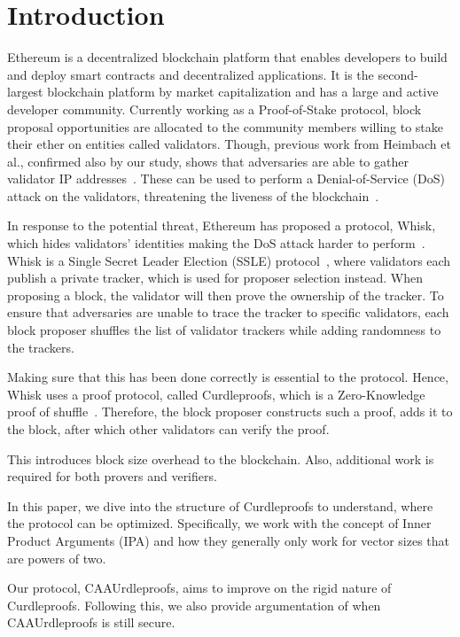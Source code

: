 

\section{Introduction}\label{sec:introduction}
Ethereum is a decentralized blockchain platform that enables developers to build and deploy smart contracts and decentralized applications.
It is the second-largest blockchain platform by market capitalization and has a large and active developer community.
Currently working as a Proof-of-Stake protocol, block proposal opportunities are allocated to the community members willing to stake their ether on entities called validators.
Though, previous work from Heimbach et al., confirmed also by our study, shows that adversaries are able to gather validator IP addresses~\cite{heimbach2024deanonymizingethereumvalidatorsp2p,ouroldpaper}.
These can be used to perform a Denial-of-Service (DoS) attack on the validators, threatening the liveness of the blockchain~\cite{EthereumAttackDefense2024,ouroldpaper}.

In response to the potential threat, Ethereum has proposed a protocol, Whisk, which hides validators' identities making the DoS attack harder to perform~\cite{Whisk2024}.
Whisk is a Single Secret Leader Election (SSLE) protocol~\cite{10.1145/3419614.3423258}, where validators each publish a private tracker, which is used for proposer selection instead.
When proposing a block, the validator will then prove the ownership of the tracker.
To ensure that adversaries are unable to trace the tracker to specific validators, each block proposer shuffles the list of validator trackers while adding randomness to the trackers.

Making sure that this has been done correctly is essential to the protocol.
Hence, Whisk uses a proof protocol, called Curdleproofs, which is a Zero-Knowledge proof of shuffle~\cite{Curdleproofs}.
Therefore, the block proposer constructs such a proof, adds it to the block, after which other validators can verify the proof.

This introduces block size overhead to the blockchain.
Also, additional work is required for both provers and verifiers.

In this paper, we dive into the structure of Curdleproofs to understand, where the protocol can be optimized.
Specifically, we work with the concept of Inner Product Arguments (IPA) and how they generally only work for vector sizes that are powers of two.

Our protocol, CAAUrdleproofs, aims to improve on the rigid nature of Curdleproofs.
Following this, we also provide argumentation of when CAAUrdleproofs is still secure.

